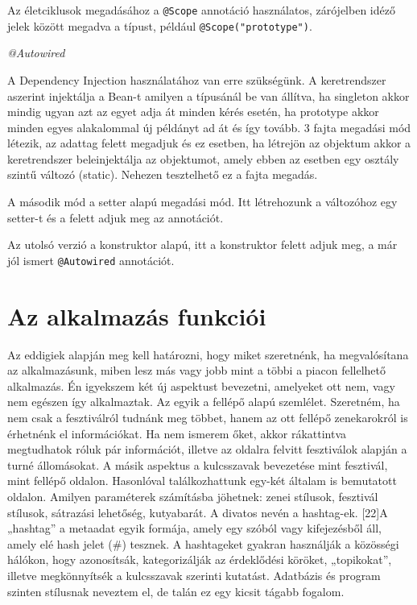 \documentclass[11pt]{article}
\begin{document}
Az életciklusok megadásához a \texttt{@Scope} annotáció használatos, zárójelben idéző jelek között megadva a típust, például \texttt{@Scope("prototype")}.

\textit{@Autowired}

A Dependency Injection használatához van erre szükségünk. A keretrendszer aszerint injektálja a Bean-t amilyen a típusánál be van állítva, ha singleton akkor mindig ugyan azt az egyet adja át minden kérés esetén, ha prototype akkor minden egyes alakalommal új példányt ad át és így tovább.
3 fajta megadási mód létezik, az adattag felett megadjuk és ez esetben, ha létrejön az objektum akkor a keretrendszer beleinjektálja az objektumot, amely ebben az esetben egy osztály szintű változó (static). Nehezen tesztelhető ez a fajta megadás.

A második mód a setter alapú megadási mód. Itt létrehozunk a változóhoz egy setter-t és a felett adjuk meg az annotációt.

Az utolsó verzió a konstruktor alapú, itt a konstruktor felett adjuk meg, a már jól ismert \texttt{@Autowired} annotációt.

\section{Az alkalmazás funkciói}

Az eddigiek alapján meg kell határozni, hogy miket szeretnénk, ha megvalósítana az alkalmazásunk, miben lesz más vagy jobb mint a többi a piacon fellelhető alkalmazás. Én igyekszem két új aspektust bevezetni, amelyeket ott nem, vagy nem egészen így alkalmaztak. Az egyik a fellépő alapú szemlélet. Szeretném, ha nem csak a fesztiválról tudnánk meg többet, hanem az ott fellépő zenekarokról is érhetnénk el információkat. Ha nem ismerem őket, akkor rákattintva megtudhatok róluk pár információt, illetve az oldalra felvitt fesztiválok alapján a turné állomásokat. A másik aspektus a kulcsszavak bevezetése mint fesztivál, mint fellépő oldalon. Hasonlóval találkozhattunk egy-két általam is bemutatott oldalon. Amilyen paraméterek számításba jöhetnek: zenei stílusok, fesztivál stílusok, sátrazási lehetőség, kutyabarát. A divatos nevén a hashtag-ek.
[22]A „hashtag” a metaadat egyik formája, amely egy szóból vagy kifejezésből áll, amely elé hash jelet (\#) tesznek. A hashtageket gyakran használják a közösségi hálókon, hogy azonosítsák, kategorizálják az érdeklődési köröket, „topikokat”, illetve megkönnyítsék a kulcsszavak szerinti kutatást.
Adatbázis és program szinten stílusnak neveztem el, de talán ez egy kicsit tágabb fogalom.
\end{document}
